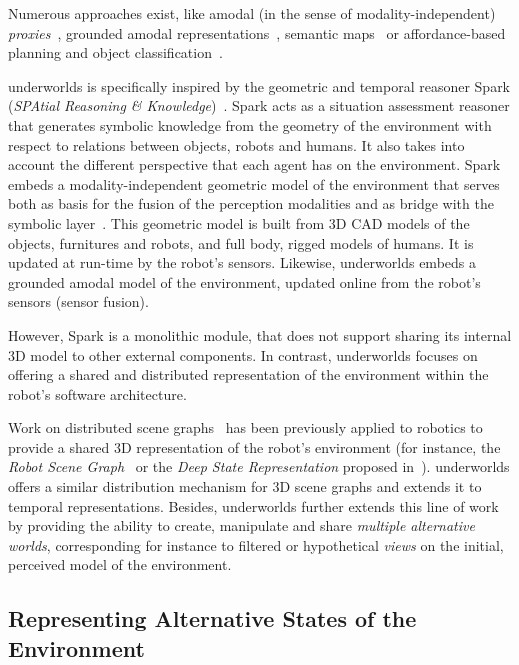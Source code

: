 \documentclass[letterpaper, 10 pt, conference]{ieeeconf}  %
\newcommand{\uwds}{{\sc underworlds}\xspace}
\begin{document}
Numerous approaches exist, like amodal (in the sense of modality-independent)
\emph{proxies}~\cite{Jacobsson2008}, grounded amodal
representations~\cite{Mavridis2006}, semantic
maps~\cite{Nuechter2008, Galindo2008,Blodow2011} or affordance-based planning
and object classification~\cite{Lorken2008, Varadarajan2011}.


\uwds is specifically inspired by the geometric and temporal reasoner
{\sc Spark} (\emph{SPAtial Reasoning \& Knowledge})~\cite{sisbot2011situation}.
{\sc Spark} acts as a situation assessment reasoner that generates symbolic
knowledge from the geometry of the environment with respect to relations between
objects, robots and humans. It also takes into account the different perspective
that each agent has on the environment. {\sc Spark} embeds a
modality-independent geometric model of the environment that serves both as
basis for the fusion of the perception modalities and as bridge with the
symbolic layer~\cite{lemaignan2016artificial}. This geometric model is built
from 3D CAD models of the objects, furnitures and robots, and full body, rigged
models of humans.  It is updated at run-time by the robot's sensors.
Likewise, \uwds embeds a grounded amodal model of the environment, updated
online from the robot's sensors (sensor fusion).

However, {\sc Spark} is a monolithic module, that does not support sharing its
internal 3D model to other external components. In contrast, \uwds focuses on
offering a shared and distributed representation of the environment within the
robot's software architecture.

Work on distributed scene graphs~\cite{naef2003blue} has been previously applied
to robotics to provide a shared 3D representation of the robot's environment
(for instance, the \emph{Robot Scene Graph}~\cite{blumenthal2013scene} or the
\emph{Deep State Representation} proposed in~\cite{bustos2016unified}).  \uwds
offers a similar distribution mechanism for 3D scene graphs and extends it to
temporal representations. Besides, \uwds further extends this line of work by
providing the ability to create, manipulate and share \emph{multiple alternative
worlds}, corresponding for instance to filtered or hypothetical \emph{views} on
the initial, perceived model of the environment.


\subsection{Representing Alternative States of the Environment}
\end{document}
